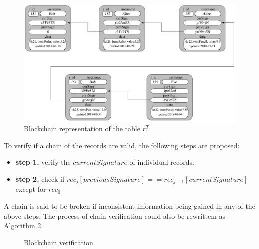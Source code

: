 			\begin{figure}
				\centering
				\includegraphics[width=\textwidth]{figs/temporal_blockchain.pdf}
				\caption{Blockchain representation of the table $r_1^T$.}
				\label{fig:blockchain_representation}
			\end{figure}


			\begin{defn}
				To verify if a chain of the records are valid, the following steps are proposed:
				\begin{itemize}
					\item \textbf{step 1.} verify the $currentSignature$ of individual records.
					\item \textbf{step 2.} check if $rec_j[previousSignature] == rec_{j-1}[currentSignature]$ except for $rec_0$
				\end{itemize}
			\label{chain_verification}
			\end{defn}

			A chain is said to be broken if inconsistent information being gained in any of the above steps. The process of chain verification could also be rewrittem as Algorithm \ref{alg:blockchain_verification}.

			\begin{figure}[h]
				\begin{algorithm}[H]
					\SetAlgoLined
					\caption{Blockchain verification}
					\SetAlCapNameFnt{\tiny}
					\label{alg:blockchain_verification}
					\DontPrintSemicolon
				\end{algorithm} 
			\end{figure}

